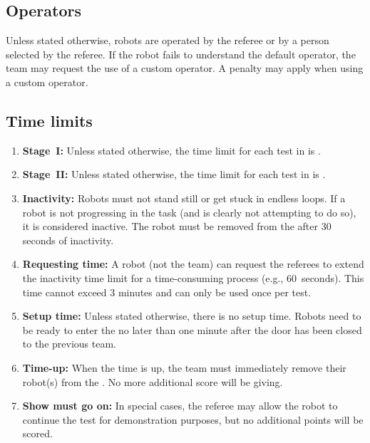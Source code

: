 \subsection{Operators}\label{rule:operator}
Unless stated otherwise, robots are operated by the referee or by a person selected by the referee.
If the robot fails to understand the default operator, the team may request the use of a custom operator.
A penalty may apply when using a custom operator.


\subsection{Time limits}\label{rule:time_limits}
\begin{enumerate}
	\item \textbf{Stage~I:} Unless stated otherwise, the time limit for each test in  is .

	\item \textbf{Stage~II:} Unless stated otherwise, the time limit for each test in  is .

	\item \textbf{Inactivity:} Robots must not stand still or get stuck in endless loops.
	If a robot is not progressing in the task (and is clearly not attempting to do so), it is considered inactive.
	The robot must be removed from the \Arena{} after 30 seconds of inactivity.

	\item \textbf{Requesting time:} A robot (not the team) can request the referees to extend the inactivity time limit for a time-consuming process (e.g., 60~seconds). This time cannot exceed 3 minutes and can only be used once per test.

	\item \textbf{Setup time:} Unless stated otherwise, there is no setup time.
	Robots need to be ready to enter the \Arena{} no later than one minute after the door has been closed to the previous team.

	\item \textbf{Time-up:} When the time is up, the team must immediately remove their robot(s) from the  \Arena{}.
	No more additional score will be giving.

	\item \textbf{Show must go on:} In special cases, the referee may allow the robot to continue the test for demonstration purposes, but no additional points will be scored.
\end{enumerate}
